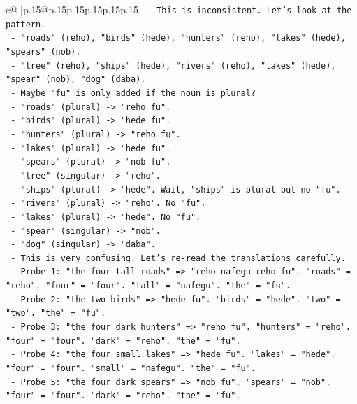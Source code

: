\documentclass{article}
\begin{document}
{\begin{supertabular}{c@{$\;$}|p{.15\linewidth}@{}p{.15\linewidth}p{.15\linewidth}p{.15\linewidth}p{.15\linewidth}p{.15\linewidth}}
{{{\texttt{        {-} This is inconsistent. Let's look at the pattern.} \\
\texttt{        {-} "roads" (reho), "birds" (hede), "hunters" (reho), "lakes" (hede), "spears" (nob).} \\
\texttt{        {-} "tree" (reho), "ships" (hede), "rivers" (reho), "lakes" (hede), "spear" (nob), "dog" (daba).} \\
\texttt{        {-} Maybe "fu" is only added if the noun is plural?} \\
\texttt{        {-} "roads" (plural) {-}> "reho fu".} \\
\texttt{        {-} "birds" (plural) {-}> "hede fu".} \\
\texttt{        {-} "hunters" (plural) {-}> "reho fu".} \\
\texttt{        {-} "lakes" (plural) {-}> "hede fu".} \\
\texttt{        {-} "spears" (plural) {-}> "nob fu".} \\
\texttt{        {-} "tree" (singular) {-}> "reho".} \\
\texttt{        {-} "ships" (plural) {-}> "hede". Wait, "ships" is plural but no "fu".} \\
\texttt{        {-} "rivers" (plural) {-}> "reho". No "fu".} \\
\texttt{        {-} "lakes" (plural) {-}> "hede". No "fu".} \\
\texttt{        {-} "spear" (singular) {-}> "nob".} \\
\texttt{        {-} "dog" (singular) {-}> "daba".} \\
\texttt{        {-} This is very confusing. Let's re{-}read the translations carefully.} \\
\texttt{        {-} Probe 1: "the four tall roads" => "reho nafegu reho fu". "roads" = "reho". "four" = "four". "tall" = "nafegu". "the" = "fu".} \\
\texttt{        {-} Probe 2: "the two birds" => "hede fu". "birds" = "hede". "two" = "two". "the" = "fu".} \\
\texttt{        {-} Probe 3: "the four dark hunters" => "reho fu". "hunters" = "reho". "four" = "four". "dark" = "reho". "the" = "fu".} \\
\texttt{        {-} Probe 4: "the four small lakes" => "hede fu". "lakes" = "hede". "four" = "four". "small" = "nafegu". "the" = "fu".} \\
\texttt{        {-} Probe 5: "the four dark spears" => "nob fu". "spears" = "nob". "four" = "four". "dark" = "reho". "the" = "fu".} \\
}}}
\end{supertabular}}
\end{document}

